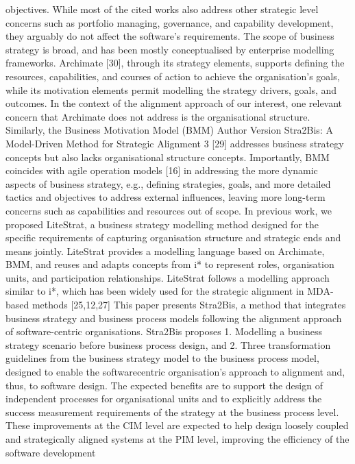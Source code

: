 objectives. While most of the cited works also address other strategic level concerns such as portfolio managing, governance, and capability development, they
arguably do not affect the software’s requirements.
The scope of business strategy is broad, and has been mostly conceptualised
by enterprise modelling frameworks. Archimate [30], through its strategy elements, supports defining the resources, capabilities, and courses of action to
achieve the organisation’s goals, while its motivation elements permit modelling
the strategy drivers, goals, and outcomes. In the context of the alignment approach of our interest, one relevant concern that Archimate does not address is
the organisational structure. Similarly, the Business Motivation Model (BMM)
Author Version
Stra2Bis: A Model-Driven Method for Strategic Alignment 3
[29] addresses business strategy concepts but also lacks organisational structure
concepts. Importantly, BMM coincides with agile operation models [16] in addressing the more dynamic aspects of business strategy, e.g., defining strategies,
goals, and more detailed tactics and objectives to address external influences,
leaving more long-term concerns such as capabilities and resources out of scope.
In previous work, we proposed LiteStrat, a business strategy modelling method
designed for the specific requirements of capturing organisation structure and
strategic ends and means jointly. LiteStrat provides a modelling language based
on Archimate, BMM, and reuses and adapts concepts from i* to represent roles,
organisation units, and participation relationships. LiteStrat follows a modelling
approach similar to i*, which has been widely used for the strategic alignment
in MDA-based methods [25,12,27]
This paper presents Stra2Bis, a method that integrates business strategy
and business process models following the alignment approach of software-centric
organisations. Stra2Bis proposes 1. Modelling a business strategy scenario before
business process design, and 2. Three transformation guidelines from the business
strategy model to the business process model, designed to enable the softwarecentric organisation’s approach to alignment and, thus, to software design.
The expected benefits are to support the design of independent processes for
organisational units and to explicitly address the success measurement requirements of the strategy at the business process level. These improvements at the
CIM level are expected to help design loosely coupled and strategically aligned
systems at the PIM level, improving the efficiency of the software development
